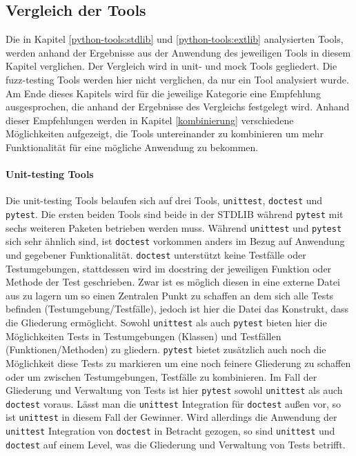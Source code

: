 \subsection{Vergleich der Tools}\label{vergleich}

Die in Kapitel \ref{python-tools:stdlib} und \ref{python-tools:extlib}
analysierten Tools, werden anhand der Ergebnisse aus der Anwendung des
jeweiligen Tools in diesem Kapitel verglichen. Der Vergleich wird in unit- und
\gls{mock} Tools gegliedert. Die \gls{fuzz}-testing Tools werden hier
nicht verglichen, da nur ein Tool analysiert wurde.
Am Ende dieses Kapitels wird für die jeweilige Kategorie eine Empfehlung 
ausgesprochen, die anhand der Ergebnisse des Vergleichs festgelegt wird. Anhand 
dieser Empfehlungen werden in Kapitel \ref{kombinierung} verschiedene 
Möglichkeiten aufgezeigt, die Tools untereinander zu kombinieren um mehr 
Funktionalität für eine mögliche Anwendung zu bekommen.

\paragraph{Unit-testing Tools}\label{vergleich:unit}\mbox{}
\newline
Die unit-testing Tools belaufen sich auf drei Tools, \lstinline{unittest},
\lstinline{doctest} und \lstinline{pytest}. Die ersten beiden Tools sind beide
in der STDLIB während \lstinline{pytest} mit sechs weiteren Paketen betrieben
werden muss. Während \lstinline{unittest} und \lstinline{pytest} sich sehr
ähnlich sind, ist \lstinline{doctest} vorkommen anders im Bezug auf Anwendung
und gegebener Funktionalität. \lstinline{doctest} unterstützt keine Testfälle
oder Testumgebungen, stattdessen wird im \gls{docstring} der jeweiligen
Funktion oder Methode der Test geschrieben. Zwar ist es möglich diesen in eine
externe Datei aus zu lagern um so einen Zentralen Punkt zu schaffen an dem sich
alle Tests befinden (Testumgebung/Testfälle), jedoch ist hier die Datei das
Konstrukt, dass die Gliederung ermöglicht. Sowohl \lstinline{unittest} als auch
\lstinline{pytest} bieten hier die Möglichkeiten Tests in Testumgebungen
(Klassen) und Testfällen (Funktionen/Methoden) zu gliedern. \lstinline{pytest}
bietet zusätzlich auch noch die Möglichkeit diese Tests zu markieren um eine
noch feinere Gliederung zu schaffen oder um zwischen Testumgebungen, Testfälle
zu kombinieren. Im Fall der Gliederung und Verwaltung von Tests ist hier
\lstinline{pytest} sowohl \lstinline{unittest} als auch \lstinline{doctest}
voraus. Lässt man die \lstinline{unittest} Integration für \lstinline{doctest}
außen vor, so ist \lstinline{unittest} in diesem Fall der Gewinner. Wird
allerdings die Anwendung der \lstinline{unittest} Integration von
\lstinline{doctest} in Betracht gezogen, so sind \lstinline{unittest} und
\lstinline{doctest} auf einem Level, was die Gliederung und Verwaltung von
Tests betrifft.

